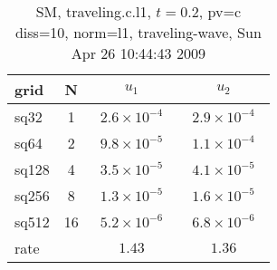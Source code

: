 \begin{table}[hbt]\tableFont %
\begin{center}
\begin{tabular}{|l|c|c|c|} \hline\hline 
grid  & N &  $u_1$ & $u_2$  \\ \hline 
                sq32 &     1 & ~$2.6\times10^{ -4}$~ & ~$2.9\times10^{ -4}$~  \\ \hline
                sq64 &     2 & ~$9.8\times10^{ -5}$~ & ~$1.1\times10^{ -4}$~  \\ \hline
               sq128 &     4 & ~$3.5\times10^{ -5}$~ & ~$4.1\times10^{ -5}$~  \\ \hline
               sq256 &     8 & ~$1.3\times10^{ -5}$~ & ~$1.6\times10^{ -5}$~  \\ \hline
               sq512 &    16 & ~$5.2\times10^{ -6}$~ & ~$6.8\times10^{ -6}$~  \\ \hline
    rate             &       &       $1.43$          &       $1.36$           \\ \hline\hline
\end{tabular}
\caption{SM, traveling.c.l1, $t=0.2$,  pv=c diss=10, norm=l1, traveling-wave, Sun Apr 26 10:44:43 2009}\label{table:traveling.c.l1}
\end{center}
\end{table}
